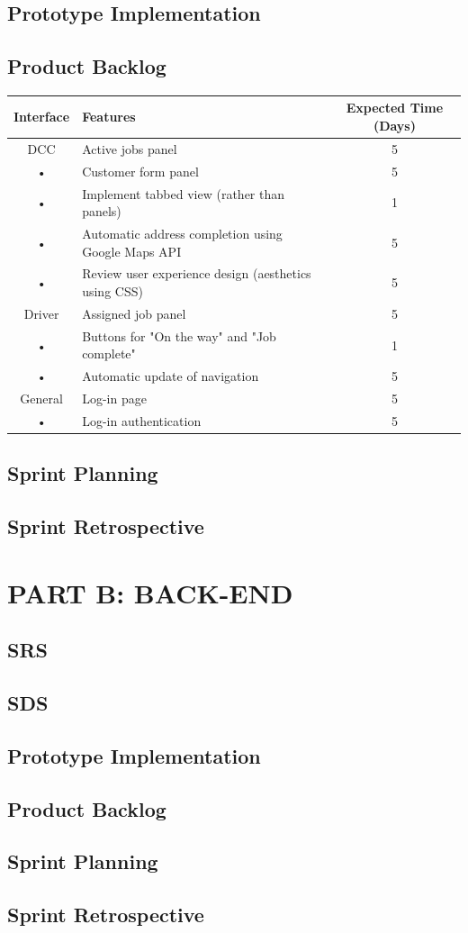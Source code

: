 \documentclass[12pt]{article}
\begin{document}
\subsection{Prototype Implementation}
\subsection{Product Backlog}
\begin{tabular}{|c|l|c|}
\hline 
Interface & Features & Expected Time (Days)\\ 
\hline 
DCC & Active jobs panel & 5\\ 
• & Customer form panel & 5\\ 
• & Implement tabbed view (rather than panels) & 1 \\
• & Automatic address completion using Google Maps API & 5\\
• & Review user experience design (aesthetics using CSS) & 5\\

\hline 
Driver & Assigned job panel & 5\\
• & Buttons for "On the way" and "Job complete" & 1\\ 
• & Automatic update of navigation & 5\\
\hline 
General & Log-in page & 5\\ 
• & Log-in authentication & 5\\
\hline
\end{tabular} 
\subsection{Sprint Planning}
\subsection{Sprint Retrospective}





\newpage
\section{PART B: BACK-END}
\subsection{SRS}
\subsection{SDS}
\subsection{Prototype Implementation}
\subsection{Product Backlog}

\subsection{Sprint Planning}
\subsection{Sprint Retrospective}
\end{document}
